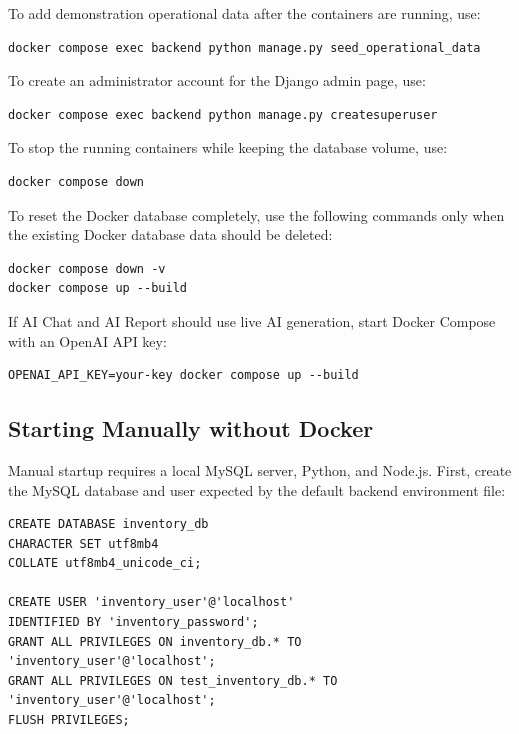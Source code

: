To add demonstration operational data after the containers are running, use:

\begin{verbatim}
docker compose exec backend python manage.py seed_operational_data
\end{verbatim}

To create an administrator account for the Django admin page, use:

\begin{verbatim}
docker compose exec backend python manage.py createsuperuser
\end{verbatim}

To stop the running containers while keeping the database volume, use:

\begin{verbatim}
docker compose down
\end{verbatim}

To reset the Docker database completely, use the following commands only when the existing Docker database data should be deleted:

\begin{verbatim}
docker compose down -v
docker compose up --build
\end{verbatim}

If AI Chat and AI Report should use live AI generation, start Docker Compose with an OpenAI API key:

\begin{verbatim}
OPENAI_API_KEY=your-key docker compose up --build
\end{verbatim}

\subsection{Starting Manually without Docker}

Manual startup requires a local MySQL server, Python, and Node.js. First, create the MySQL database and user expected by the default backend environment file:

\begin{verbatim}
CREATE DATABASE inventory_db
CHARACTER SET utf8mb4
COLLATE utf8mb4_unicode_ci;

CREATE USER 'inventory_user'@'localhost'
IDENTIFIED BY 'inventory_password';
GRANT ALL PRIVILEGES ON inventory_db.* TO 'inventory_user'@'localhost';
GRANT ALL PRIVILEGES ON test_inventory_db.* TO 'inventory_user'@'localhost';
FLUSH PRIVILEGES;
\end{verbatim}

